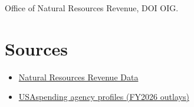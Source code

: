 \documentclass[letterpaper,11pt]{article}
\providecommand{\tightlist}{\setlength{\itemsep}{0pt}\setlength{\parskip}{0pt}}
\begin{document}
Office of Natural Resources Revenue, DOI OIG.

\hypertarget{sources}{%
\section{Sources}\label{sources}}

\begin{itemize}
\tightlist
\item
  \href{https://revenuedata.doi.gov/}{Natural Resources Revenue Data}
\item
  \href{https://www.usaspending.gov/agency}{USAspending agency profiles
  (FY2026 outlays)}
\end{itemize}
\end{document}

